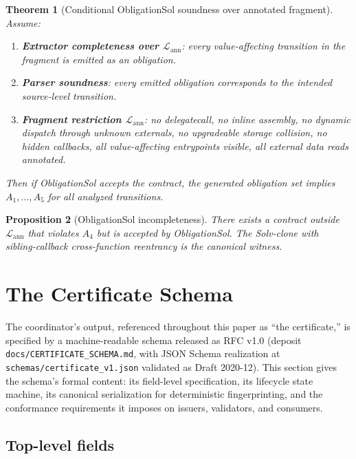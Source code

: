 \documentclass[11pt,a4paper]{article}
\newtheorem{theorem}{Theorem}
\newtheorem{proposition}[theorem]{Proposition}
\begin{document}
\begin{theorem}[Conditional ObligationSol soundness over annotated fragment]
Assume:
\begin{enumerate}
  \item \textbf{Extractor completeness over $\mathcal{L}_{\mathrm{ann}}$}: every value-affecting transition in the fragment is emitted as an obligation.
  \item \textbf{Parser soundness}: every emitted obligation corresponds to the intended source-level transition.
  \item \textbf{Fragment restriction $\mathcal{L}_{\mathrm{ann}}$}: no delegatecall, no inline assembly, no dynamic dispatch through unknown externals, no upgradeable storage collision, no hidden callbacks, all value-affecting entrypoints visible, all external data reads annotated.
\end{enumerate}
Then if ObligationSol accepts the contract, the generated obligation set implies $A_1, \ldots, A_5$ for all analyzed transitions.
\end{theorem}

\begin{proposition}[ObligationSol incompleteness]
There exists a contract outside $\mathcal{L}_{\mathrm{ann}}$ that violates $A_4$ but is accepted by ObligationSol. The Solv-clone with sibling-callback cross-function reentrancy is the canonical witness.
\end{proposition}

\section{The Certificate Schema}\label{sec:cert-schema}

The coordinator's output, referenced throughout this paper as ``the certificate,'' is specified by a machine-readable schema released as RFC v1.0 (deposit \texttt{docs/CERTIFICATE\_SCHEMA.md}, with JSON Schema realization at \texttt{schemas/certificate\_v1.json} validated as Draft 2020-12). This section gives the schema's formal content: its field-level specification, its lifecycle state machine, its canonical serialization for deterministic fingerprinting, and the conformance requirements it imposes on issuers, validators, and consumers.

\subsection{Top-level fields}
\end{document}

